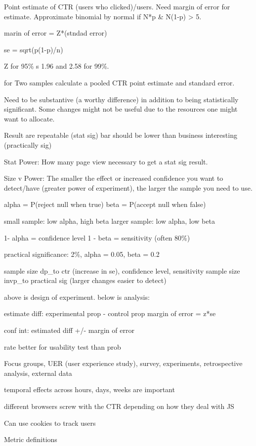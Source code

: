 \documentclass[]{book}
\begin{document}
Point estimate of CTR (users who clicked)/users. Need margin of error for estimate. Approximate binomial by normal if N*p \& N(1-p) \textgreater{} 5.

marin of error = Z*(stndad error)

se = sqrt(p(1-p)/n)

Z for 95\% s 1.96 and 2.58 for 99\%.

for Two samples calculate a pooled CTR point estimate and standard error.

Need to be substantive (a worthy difference) in addition to being statistically significant. Some changes might not be useful due to the resources one might want to allocate.

Result are repeatable (stat sig) bar should be lower than business interesting (practically sig)

Stat Power: How many page view necessary to get a stat sig result.

Size v Power: The smaller the effect or increased confidence you want to detect/have (greater power of experiment), the larger the sample you need to use.

alpha = P(reject null when true)
beta = P(accept null when false)

small sample: low alpha, high beta
larger sample: low alpha, low beta

1- alpha = confidence level
1 - beta = sensitivity (often 80\%)

practical significance: 2\%, alpha = 0.05, beta = 0.2

sample size dp\_to ctr (increase in se), confidence level, sensitivity
sample size invp\_to practical sig (larger changes easier to detect)

above is design of experiment. below is analysis:

estimate diff: experimental prop - control prop
margin of error = z*se

conf int: estimated diff +/- margin of error

rate better for usability test than prob

Focus groups, UER (user experience study), survey, experiments, retrospective analysis, external data

temporal effects across hours, days, weeks are important

different browsers screw with the CTR depending on how they deal with JS

Can use cookies to track users

Metric definitions
\end{document}

